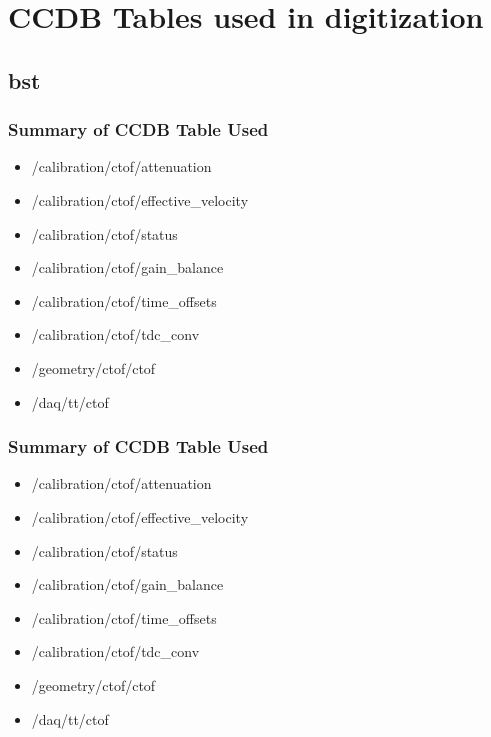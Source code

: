 \appendix


\section{CCDB Tables used in digitization}


\subsection{bst}

\subsubsection{Summary of CCDB Table Used}

\begin{itemize}
\item /calibration/ctof/attenuation
\item /calibration/ctof/effective\_velocity
\item /calibration/ctof/status
\item /calibration/ctof/gain\_balance
\item /calibration/ctof/time\_offsets
\item /calibration/ctof/tdc\_conv
\item /geometry/ctof/ctof
\item /daq/tt/ctof
\end{itemize}

\subsubsection{Summary of CCDB Table Used}

\begin{itemize}
\item /calibration/ctof/attenuation
\item /calibration/ctof/effective\_velocity
\item /calibration/ctof/status
\item /calibration/ctof/gain\_balance
\item /calibration/ctof/time\_offsets
\item /calibration/ctof/tdc\_conv
\item /geometry/ctof/ctof
\item /daq/tt/ctof
\end{itemize}

